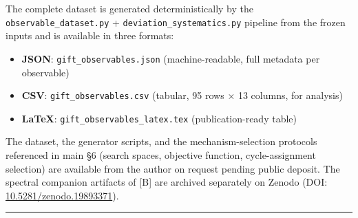 \documentclass[11pt,a4paper]{article}
\begin{document}
The complete dataset is generated deterministically by the \texttt{observable\_\allowbreak{}dataset.\allowbreak{}py} + \texttt{deviation\_\allowbreak{}systematics.\allowbreak{}py} pipeline from the frozen inputs and is available in three formats:

\begin{itemize}
\tightlist
\item
  \textbf{JSON}: \texttt{gift\_\allowbreak{}observables.\allowbreak{}json} (machine-readable, full metadata per observable)
\item
  \textbf{CSV}: \texttt{gift\_\allowbreak{}observables.\allowbreak{}csv} (tabular, 95 rows × 13 columns, for analysis)
\item
  \textbf{LaTeX}: \texttt{gift\_\allowbreak{}observables\_\allowbreak{}latex.\allowbreak{}tex} (publication-ready table)
\end{itemize}

The dataset, the generator scripts, and the mechanism-selection protocols referenced in main §6 (search spaces, objective function, cycle-assignment selection) are available from the author on request pending public deposit. The spectral companion artifacts of {[}B{]} are archived separately on Zenodo (DOI: \href{https://doi.org/10.5281/zenodo.19893371}{10.5281/zenodo.19893371}).

\begin{center}\rule{\linewidth}{0.5pt}\end{center}


\bigskip

\end{document}
